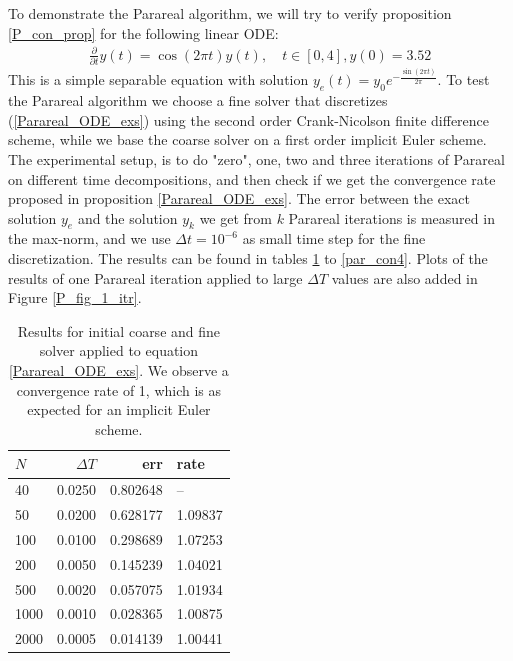 \\
\\
To demonstrate the Parareal algorithm, we will try to verify proposition \ref{P_con_prop} for the following linear ODE:
\begin{align}
\frac{\partial}{\partial t} y(t) =\cos(2\pi t)y(t), \quad t\in[0,4],y(0)=3.52 \label{Parareal_ODE_exs}
\end{align}
This is a simple separable equation with solution $y_e(t)=y_0e^{-\frac{\sin(2\pi t)}{2\pi}}$. To test the Parareal algorithm we choose a fine solver that discretizes (\ref{Parareal_ODE_exs}) using the second order Crank-Nicolson finite difference scheme\cite{crank1947practical}, while we base the coarse solver on a first order implicit Euler scheme. The experimental setup, is to do "zero", one, two and three iterations of Parareal on different time decompositions, and then check if we get the convergence rate proposed in proposition \ref{Parareal_ODE_exs}. The error between the exact solution $y_e$ and the solution $y_k$ we get from $k$ Parareal iterations is measured in the max-norm, and we use $\Delta t=10^{-6}$ as small time step for the fine discretization. The results can be found in tables \ref{par_con1} to \ref{par_con4}. Plots of the results of one Parareal iteration applied to large $\Delta T$ values are also added in Figure \ref{P_fig_1_itr}.
\\
\begin{table}[h]
\centering
\caption{Results for initial coarse and fine solver applied to equation \ref{Parareal_ODE_exs}. We observe a convergence rate of 1, which is as expected for an implicit Euler scheme.}
\label{par_con1}
\begin{tabular}{lrrl}
\toprule
{}$N$ &      $\Delta T$ &       err &     rate \\
\midrule
40   &  0.0250 &  0.802648 &       -- \\
50   &  0.0200 &  0.628177 &  1.09837 \\
100  &  0.0100 &  0.298689 &  1.07253 \\
200  &  0.0050 &  0.145239 &  1.04021 \\
500  &  0.0020 &  0.057075 &  1.01934 \\
1000 &  0.0010 &  0.028365 &  1.00875 \\
2000 &  0.0005 &  0.014139 &  1.00441 \\
\bottomrule
\end{tabular}
\end{table}
